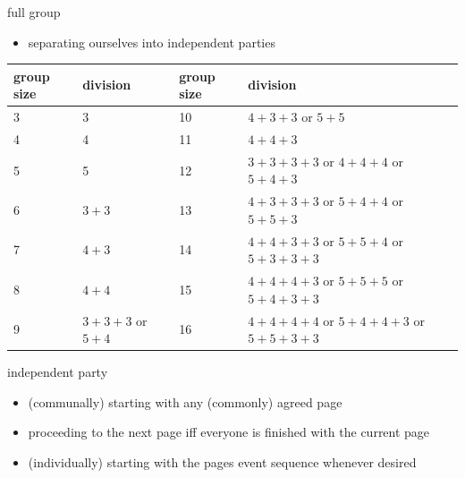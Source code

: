 \documentclass[12pt,a4paper,ngerman]{article}
\begin{document}
\vspace{1.5cm}



\hspace{1.5cm} {\large full group} \hfill

\begin{itemize}

    \item{separating ourselves into independent parties}

\end{itemize}


\vspace{0.15cm}

\hspace{0.5cm} \begin{minipage}[b]{.8\textwidth}


    \footnotesize


    \begin{tabular}{l l || l l} 
        group size & division & group size & division \\ [0.5ex] 
        \hline
        3 & 3 & 10 & $4+3+3$ or $5+5$\\
        4 & 4 & 11 & $4+4+3$\\
        5 & 5 & 12 & $3+3+3+3$ or $4+4+4$ or $5+4+3$\\
        6 & $3+3$ & 13 & $4+3+3+3$ or $5+4+4$ or $5+5+3$\\
        7 & $4+3$ & 14 & $4+4+3+3$ or $5+5+4$ or $5+3+3+3$\\
        8 & $4+4$ & 15 & $4+4+4+3$ or $5+5+5$ or $5+4+3+3$\\
        9 & $3+3+3$ or $5+4$ & 16 & $4+4+4+4$ or $5+4+4+3$ or $5+5+3+3$\\
    \end{tabular}
    
\end{minipage}%

\vspace{1cm}


\hspace{1.5cm} {\large independent party} \hfill

\begin{itemize}

    \item{(communally) starting with any (commonly) agreed page}

    \item{proceeding to the next page iff everyone is finished with the current page}

    \item{(individually) starting with the pages event sequence whenever desired}

\end{itemize}
\end{document}
